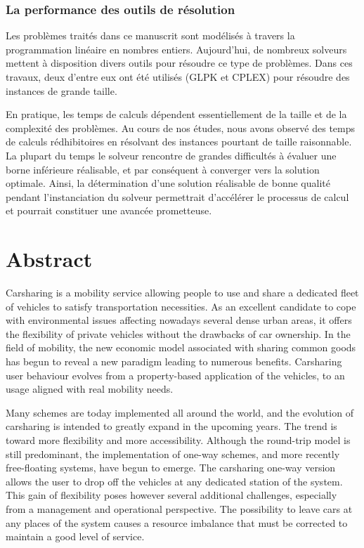 \subsection*{La performance des outils de résolution}
Les problèmes traités dans ce manuscrit sont modélisés à travers la programmation linéaire en nombres entiers.
Aujourd'hui, de nombreux solveurs mettent à disposition divers outils pour résoudre ce type de problèmes.
Dans ces travaux, deux d'entre eux ont été utilisés (GLPK et CPLEX) pour résoudre des instances de grande taille.

\medskip
En pratique, les temps de calculs dépendent essentiellement de la taille et de la complexité des problèmes.
Au cours de nos études, nous avons observé des temps de calculs rédhibitoires en résolvant des instances pourtant de taille raisonnable.
La plupart du temps le solveur rencontre de grandes difficultés à évaluer une borne inférieure réalisable, et par conséquent à converger vers la solution optimale.
Ainsi, la détermination d'une solution réalisable de bonne qualité pendant l'instanciation du solveur permettrait d'accélérer le processus de calcul et pourrait constituer une avancée prometteuse.


\cleardoublepage
\chapter*{Abstract}
Carsharing is a mobility service allowing people to use and share a dedicated fleet of vehicles to satisfy transportation necessities.
As an excellent candidate to cope with environmental issues affecting nowadays several dense urban areas, it offers the flexibility of private vehicles without the drawbacks of car ownership.
In the field of mobility, the new economic model associated with sharing common goods has begun to reveal a new paradigm leading to numerous benefits.
Carsharing user behaviour evolves from a property-based application of the vehicles, to an usage aligned with real mobility needs.

\medskip
Many schemes are today implemented all around the world, and the evolution of carsharing is intended to greatly expand in the upcoming years.
The trend is toward more flexibility and more accessibility.
Although the round-trip model is still predominant, the implementation of one-way schemes, and more recently free-floating systems, have begun to emerge.
The carsharing one-way version allows the user to drop off the vehicles at any dedicated station of the system.
This gain of flexibility poses however several additional challenges, especially from a management and operational perspective.
The possibility to leave cars at any places of the system causes a resource imbalance that must be corrected to maintain a good level of service.

